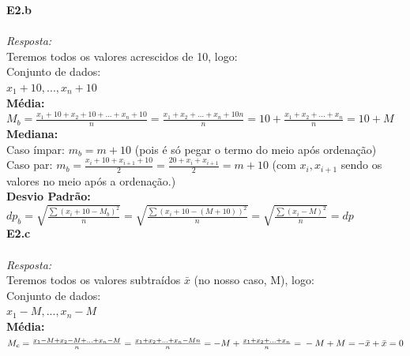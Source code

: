 \documentclass{article}
\begin{document}
    
    
    
    
	
	\textbf {E2.b} 
	\\ \\
	\textit {Resposta:} \\
	
	Teremos todos os valores acrescidos de 10, logo:\\
	
	Conjunto de dados:\\
	
	${x_1 + 10, ..., x_n + 10}$\\
	
	\textbf {Média:}\\
	
	$M_b = \frac{x_1 + 10 + x_2 + 10 + ... + x_n + 10}{n} = \frac{x_1 + x_2 + ... + x_n + 10n}{n} = 10 + \frac{x_1 + x_2 + ... + x_n}{n} = 10 + M$\\
	
	\textbf {Mediana:}\\
	
	Caso ímpar: $m_b = m + 10$ (pois é só pegar o termo do meio após ordenação)\\
	
	Caso par: $m_b = \frac{x_i + 10 + x_{i+1} + 10}{2} = \frac{20 + x_i + x_{i+1}}{2} = m + 10$ (com $x_i, x_{i+1}$ sendo os valores no meio após a ordenação.)\\
	
	\textbf {Desvio Padrão:}\\
	
	$dp_b = \sqrt{\frac {\sum (x_i + 10 - M_b)^2}{n}} = \sqrt{\frac {\sum (x_i + 10 - (M + 10))^2}{n}} = \sqrt{\frac {\sum (x_i - M)^2}{n}} = dp$\\
	
	\textbf {E2.c} 
	\\ \\
	\textit {Resposta:} \\
	
	Teremos todos os valores subtraídos $\bar{x}$ (no nosso caso, M), logo:\\
	
	Conjunto de dados:\\
	
	${x_1 - M, ... , x_n - M}$\\
	
	\textbf {Média:}\\
	
	$M_c = \frac{x_1 - M + x_2 - M + ... + x_n - M}{n} = \frac{x_1 + x_2 + ... + x_n - Mn}{n} = -M + \frac{x_1 + x_2 + ... + x_n}{n} = \\  \\
	-M + M = - \bar{x} + \bar{x} = 0$\\
	
\end{document}
